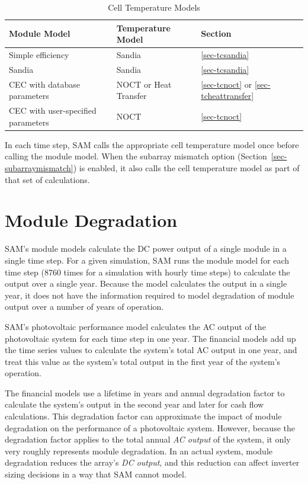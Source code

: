 \documentclass[12pt,letterpaper]{article}
\begin{document}
\begin{table}
\begin{center}
\caption{Cell Temperature Models}
\begin{tabular}{lll}
\midrule
Module Model & Temperature Model & Section\\
\midrule
Simple efficiency & Sandia & \ref{sec-tcsandia}\\
Sandia & Sandia & \ref{sec-tcsandia} \\
CEC with database parameters & NOCT or Heat Transfer & \ref{sec-tcnoct} or \ref{sec-tcheattransfer}\\
CEC with user-specified parameters & NOCT & \ref{sec-tcnoct}\\
\hline
\end{tabular}
\label{tab-tempcorr}
\end{center}
\end{table}

In each time step, SAM calls the appropriate cell temperature model once before calling the module model. When the subarray mismatch option (Section~\ref{sec-subarraymismatch}) is enabled, it also calls the cell temperature model as part of that set of calculations.

\section{Module Degradation}

SAM's module models calculate the DC power output of a single module in a single time step. For a given simulation, SAM runs the module model for each time step (8760 times for a simulation with hourly time steps) to calculate the output over a single year. Because the model calculates the output in a single year, it does not have the information required to model degradation of module output over a number of years of operation.

SAM's photovoltaic performance model calculates the AC output of the photovoltaic system for each time step in one year. The financial models add up the time series values to calculate the system's total AC output in one year, and treat this value as the system's total output in the first year of the system's operation.

The financial models use a lifetime in years and annual degradation factor to calculate the system's output in the second year and later for cash flow calculations. This degradation factor can approximate the impact of module degradation on the performance of a photovoltaic system. However, because the degradation factor applies to the total annual \textit{AC output} of the system, it only very roughly represents module degradation. In an actual system, module degradation reduces the array's \textit{DC output}, and this reduction can affect inverter sizing decisions in a way that SAM cannot model.
\end{document}
